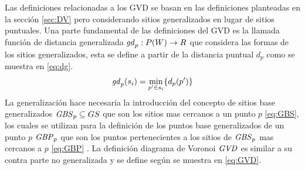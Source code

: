 Las definiciones relacionadas a los GVD se basan en las definiciones planteadas en la sección \ref{sec:DV}  pero considerando sitios generalizados en lugar de sitios puntuales. Una parte fundamental de las definiciones del GVD es la llamada función de distancia generalizada $\mathit{gd}_p : P(W) \rightarrow R$ que considera las formas de los sitios generalizados, esta se define a partir de la distancia puntual $d_p$ como se muestra en \eqref{eq:dg}.
\begin{equation}
  \mathit{gd}_p(s_i) = \min_{p'\in s_i}\{d_p(p')\} \label{eq:dg}
\end{equation}
La generalización hace necesaria la introducción del concepto de sitios base generalizados $\mathit{GBS}_p\subseteq GS$ que son los sitios mas cercanos a un punto $p$ \eqref{eq:GBS}, los cuales se utilizan para la definición de los puntos base generalizados de un punto $p$ $\mathit{GBP}_p$ que son los puntos pertenecientes a los sitios de $\mathit{GBS}_p$ mas cercanos a $p$ \eqref{eq:GBP} . 
La definición diagrama de Voronoi $\mathit{GVD}$ es similar a su contra parte no generalizada y se define según se muestra en \eqref{eq:GVD}. 




